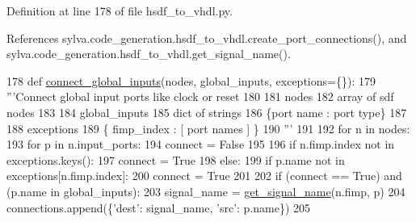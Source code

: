 Definition at line 178 of file hsdf\+\_\+to\+\_\+vhdl.\+py.



References sylva.\+code\+\_\+generation.\+hsdf\+\_\+to\+\_\+vhdl.\+create\+\_\+port\+\_\+connections(), and sylva.\+code\+\_\+generation.\+hsdf\+\_\+to\+\_\+vhdl.\+get\+\_\+signal\+\_\+name().


\begin{DoxyCode}
178 \textcolor{keyword}{def }\hyperlink{namespacesylva_1_1code__generation_1_1hsdf__to__vhdl_a4a40923ef153cf1f1a9da0c742b2e542}{connect\_global\_inputs}(nodes, global\_inputs, exceptions=\{\}):
179     \textcolor{stringliteral}{'''Connect global input ports like clock or reset}
180 \textcolor{stringliteral}{}
181 \textcolor{stringliteral}{      nodes}
182 \textcolor{stringliteral}{        array of sdf nodes}
183 \textcolor{stringliteral}{}
184 \textcolor{stringliteral}{      global\_inputs}
185 \textcolor{stringliteral}{        dict of strings}
186 \textcolor{stringliteral}{        \{port name : port type\}}
187 \textcolor{stringliteral}{}
188 \textcolor{stringliteral}{      exceptions}
189 \textcolor{stringliteral}{        \{ fimp\_index : [ port names ] \}}
190 \textcolor{stringliteral}{    '''}
191 
192     \textcolor{keywordflow}{for} n \textcolor{keywordflow}{in} nodes:
193         \textcolor{keywordflow}{for} p \textcolor{keywordflow}{in} n.input\_ports:
194             connect = \textcolor{keyword}{False}
195 
196             \textcolor{keywordflow}{if} n.fimp.index \textcolor{keywordflow}{not} \textcolor{keywordflow}{in} exceptions.keys():
197                 connect = \textcolor{keyword}{True}
198             \textcolor{keywordflow}{else}:
199                 \textcolor{keywordflow}{if} p.name \textcolor{keywordflow}{not} \textcolor{keywordflow}{in} exceptions[n.fimp.index]:
200                     connect = \textcolor{keyword}{True}
201 
202             \textcolor{keywordflow}{if} (connect == \textcolor{keyword}{True}) \textcolor{keywordflow}{and} (p.name \textcolor{keywordflow}{in} global\_inputs):
203                 signal\_name = \hyperlink{namespacesylva_1_1code__generation_1_1hsdf__to__vhdl_adfe6fda6b02f34c7fd4f2775ced8228f}{get\_signal\_name}(n.fimp, p)
204                 connections.append(\{\textcolor{stringliteral}{'dest'}: signal\_name, \textcolor{stringliteral}{'src'}: p.name\})
205 
\end{DoxyCode}
\mbox{\label{namespacesylva_1_1code__generation_1_1hsdf__to__vhdl_a5976ee6a55f22e1fc1e9fc87bac3ea62}} 
